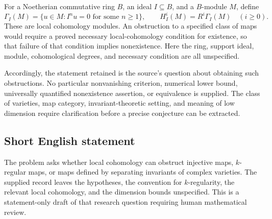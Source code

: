\documentclass[11pt]{article}
\begin{document}
For a Noetherian commutative ring \(B\), an ideal \(I\subseteq B\), and a \(B\)-module \(M\), define
\[
\Gamma_I(M)=\{u\in M: I^n u=0\text{ for some }n\geq1\},
\qquad H_I^i(M)=R^i\Gamma_I(M)\quad(i\geq0).
\]
These are local cohomology modules. An obstruction to a specified class of maps would require a proved necessary local-cohomology condition for existence, so that failure of that condition implies nonexistence. Here the ring, support ideal, module, cohomological degrees, and necessary condition are all unspecified.

Accordingly, the statement retained is the source's question about obtaining such obstructions. No particular nonvanishing criterion, numerical lower bound, universally quantified nonexistence assertion, or equivalence is supplied. The class of varieties, map category, invariant-theoretic setting, and meaning of low dimension require clarification before a precise conjecture can be extracted.
\subsection{Short English statement}
The problem asks whether local cohomology can obstruct injective maps, \(k\)-regular maps, or maps defined by separating invariants of complex varieties. The supplied record leaves the hypotheses, the convention for \(k\)-regularity, the relevant local cohomology, and the dimension bounds unspecified. This is a statement-only draft of that research question requiring human mathematical review.
\end{document}
